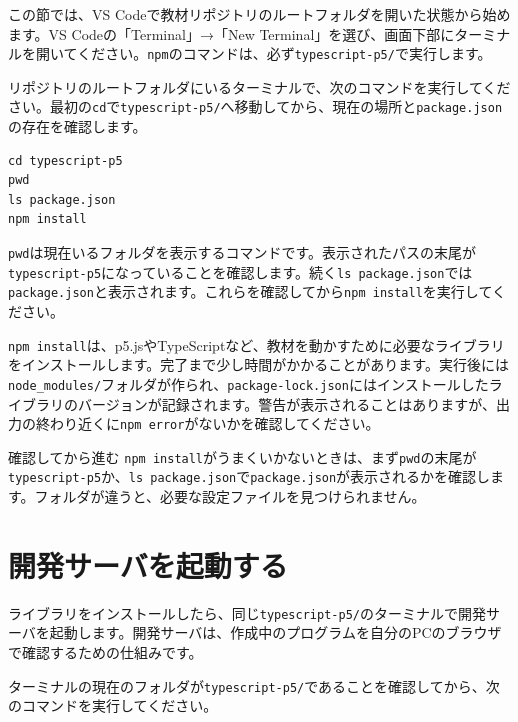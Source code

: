 この節では、VS Codeで教材リポジトリのルートフォルダを開いた状態から始めます。VS Codeの「Terminal」→「New Terminal」を選び、画面下部にターミナルを開いてください。\texttt{npm}のコマンドは、必ず\texttt{typescript-p5/}で実行します。

リポジトリのルートフォルダにいるターミナルで、次のコマンドを実行してください。最初の\texttt{cd}で\texttt{typescript-p5/}へ移動してから、現在の場所と\texttt{package.json}の存在を確認します。

\begin{listing}[htbp]
\begin{verbatim}
cd typescript-p5
pwd
ls package.json
npm install
\end{verbatim}
\caption{実行用プロジェクトで必要なライブラリをインストールするコマンド}
\label{lst:appendix-ubuntu-npm-install}
\end{listing}

\texttt{pwd}は現在いるフォルダを表示するコマンドです。表示されたパスの末尾が\texttt{typescript-p5}になっていることを確認します。続く\texttt{ls package.json}では\texttt{package.json}と表示されます。これらを確認してから\texttt{npm install}を実行してください。

\texttt{npm install}は、p5.jsやTypeScriptなど、教材を動かすために必要なライブラリをインストールします。完了まで少し時間がかかることがあります。実行後には\texttt{node\_modules/}フォルダが作られ、\texttt{package-lock.json}にはインストールしたライブラリのバージョンが記録されます。警告が表示されることはありますが、出力の終わり近くに\texttt{npm error}がないかを確認してください。

\begin{pointbox}{確認してから進む}
\texttt{npm install}がうまくいかないときは、まず\texttt{pwd}の末尾が\texttt{typescript-p5}か、\texttt{ls package.json}で\texttt{package.json}が表示されるかを確認します。フォルダが違うと、必要な設定ファイルを見つけられません。
\end{pointbox}

\section{開発サーバを起動する}

ライブラリをインストールしたら、同じ\texttt{typescript-p5/}のターミナルで開発サーバを起動します。開発サーバは、作成中のプログラムを自分のPCのブラウザで確認するための仕組みです。

ターミナルの現在のフォルダが\texttt{typescript-p5/}であることを確認してから、次のコマンドを実行してください。

